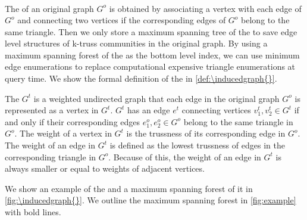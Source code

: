 \subsubsection{\InducedGraph{}}
\label{bottom-level}
~\\The \inducedgraph{} of an original graph $G^o$ is obtained by associating a vertex with each edge of $G^o$ and connecting two vertices if the corresponding edges of $G^o$ belong to the same triangle. Then we only store a maximum spanning tree of the \inducedgraph{} to save edge level structures of k-truss communities in the original graph. By using a maximum spanning forest of the \inducedgraph{} as the bottom level index, we can use minimum edge enumerations to replace computational expensive triangle enumerations at query time. We show the formal definition of the \inducedgraph{} in \autoref{def:\inducedgraph{}}. 

\begin{Def}[\Inducedgraph{}]
The \inducedgraph{} $G^t$ is a weighted undirected graph that each edge in the original graph $G^o$ is represented as a vertex in $G^t$. $G^t$ has an edge $e^{t}$ connecting vertices $v^{t}_{1}, v^{t}_{2} \in G^{t}$ if and only if their corresponding edges $e^{o}_{1}, e^{o}_{2} \in G^{o}$ belong to the same triangle in $G^o$. The weight of a vertex in $G^{t}$ is the trussness of its corresponding edge in $G^o$. The weight of an edge in $G^{t}$ is defined as the lowest trussness of edges in the corresponding triangle in $G^{o}$. Because of this, the weight of an edge in $G^t$ is always smaller or equal to weights of adjacent vertices.
\label{def:\inducedgraph{}}
\end{Def}

We show an example of the \inducedgraph{} and a maximum spanning forest of it in \autoref{fig:\inducedgraph{}}. We outline the maximum spanning forest in \autoref{fig:example} with bold lines. %


